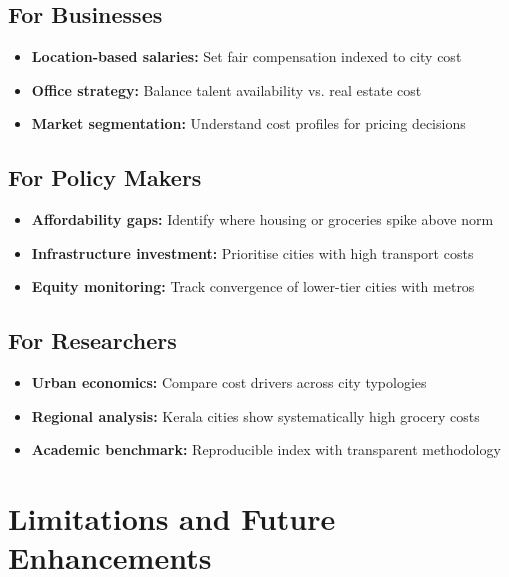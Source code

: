 \documentclass[12pt,a4paper]{article}
\begin{document}
\subsection{For Businesses}
\begin{itemize}
  \item \textbf{Location-based salaries:} Set fair compensation indexed to city cost
  \item \textbf{Office strategy:} Balance talent availability vs. real estate cost
  \item \textbf{Market segmentation:} Understand cost profiles for pricing decisions
\end{itemize}

\subsection{For Policy Makers}
\begin{itemize}
  \item \textbf{Affordability gaps:} Identify where housing or groceries spike above norm
  \item \textbf{Infrastructure investment:} Prioritise cities with high transport costs
  \item \textbf{Equity monitoring:} Track convergence of lower-tier cities with metros
\end{itemize}

\subsection{For Researchers}
\begin{itemize}
  \item \textbf{Urban economics:} Compare cost drivers across city typologies
  \item \textbf{Regional analysis:} Kerala cities show systematically high grocery costs
  \item \textbf{Academic benchmark:} Reproducible index with transparent methodology
\end{itemize}

\section{Limitations and Future Enhancements}
\end{document}
